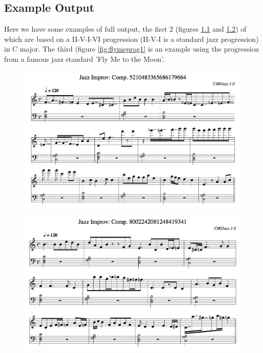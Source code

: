 \documentclass[pdftex,12pt,a4paper]{report}
\begin{document}
\begin{appendices}

\chapter{Example Output}
Here we have some examples of full output, the first 2 (figures \ref{fig:output42} and \ref{fig:output47}) of which are based on a II-V-I-VI progression (II-V-I is a standard jazz progression) in C major. The third (figure \ref{fig:flymeprog1} is an example using the progression from a famous jazz standard 'Fly Me to the Moon'. 

\begin{figure}[here]
  \centering
  \includegraphics[scale=0.47]{figure/output42.png}
  \label{fig:output42}
\end{figure}

\begin{figure}[here]
  \centering
  \includegraphics[scale=0.45]{figure/output47.png}
  \label{fig:output47}
\end{figure}


\end{appendices}
\end{document}
